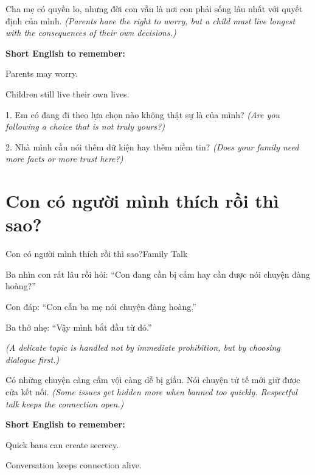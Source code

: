 \begin{baihoc}
Cha mẹ có quyền lo, nhưng đời con vẫn là nơi con phải sống lâu nhất với quyết định của mình.
\textit{(Parents have the right to worry, but a child must live longest with the consequences of their own decisions.)}
\end{baihoc}

\begin{ghinhoanh}
\textbf{Short English to remember:}

Parents may worry.

Children still live their own lives.
\end{ghinhoanh}

\begin{tuhocnhanh}
1. Em có đang đi theo lựa chọn nào không thật sự là của mình? \textit{(Are you following a choice that is not truly yours?)}

2. Nhà mình cần nói thêm dữ kiện hay thêm niềm tin? \textit{(Does your family need more facts or more trust here?)}
\end{tuhocnhanh}
\ngancach

\section{Con có người mình thích rồi thì sao?}
\begin{truyen}{Con có người mình thích rồi thì sao?}{Family Talk}

Ba nhìn con rất lâu rồi hỏi: ``Con đang cần bị cấm hay cần được nói chuyện đàng hoàng?''

Con đáp: ``Con cần ba mẹ nói chuyện đàng hoàng.''

Ba thở nhẹ: ``Vậy mình bắt đầu từ đó.''

\textit{(A delicate topic is handled not by immediate prohibition, but by choosing dialogue first.)}
\end{truyen}

\begin{baihoc}
Có những chuyện càng cấm vội càng dễ bị giấu. Nói chuyện tử tế mới giữ được cửa kết nối.
\textit{(Some issues get hidden more when banned too quickly. Respectful talk keeps the connection open.)}
\end{baihoc}

\begin{ghinhoanh}
\textbf{Short English to remember:}

Quick bans can create secrecy.

Conversation keeps connection alive.
\end{ghinhoanh}

